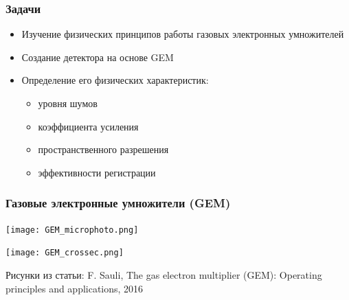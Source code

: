 \documentclass[14pt]{beamer}
\begin{document}
\begin{frame}[t]
\frametitle{Задачи}
	\begin{itemize}
		\item Изучение физических принципов работы газовых электронных умножителей
		\item Создание детектора на основе GEM 
		\item Определение его физических характеристик:
		\begin{itemize}
			\item уровня шумов
			\item коэффициента усиления
			\item пространственного разрешения
			\item эффективности регистрации
		\end{itemize}
	\end{itemize}
\end{frame}

\begin{frame}
\frametitle{Газовые электронные умножители (GEM)}
\begin{center}
	\begin{minipage}[h]{0.49\linewidth}
		\texttt{[image: GEM\_microphoto.png]}
	\end{minipage}
	\begin{minipage}[h]{0.49\linewidth}
		\texttt{[image: GEM\_crossec.png]}
	\end{minipage}
	\tiny{Рисунки из статьи: F. Sauli, The gas electron multiplier (GEM): Operating principles and applications, 2016}
	
\end{center}
\end{frame}
\end{document}
